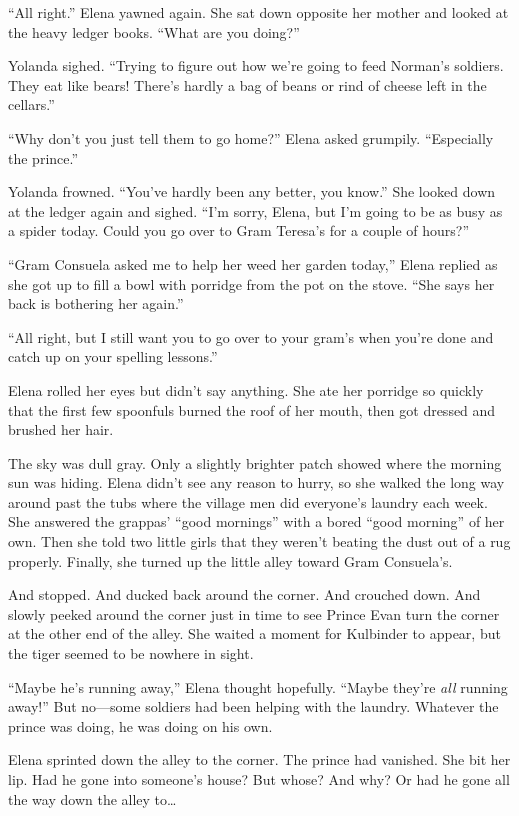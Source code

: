 \documentclass[10pt]{book}
\begin{document}
``All right.'' Elena yawned again. She sat down opposite her mother and looked at the heavy ledger books. ``What are you doing?''

Yolanda sighed. ``Trying to figure out how we're going to feed Norman's soldiers. They eat like bears! There's hardly a bag of beans or rind of cheese left in the cellars.''

``Why don't you just tell them to go home?'' Elena asked grumpily. ``Especially the prince.''

Yolanda frowned. ``You've hardly been any better, you know.'' She looked down at the ledger again and sighed. ``I'm sorry, Elena, but I'm going to be as busy as a spider today. Could you go over to Gram Teresa's for a couple of hours?''

``Gram Consuela asked me to help her weed her garden today,'' Elena replied as she got up to fill a bowl with porridge from the pot on the stove. ``She says her back is bothering her again.''

``All right, but I still want you to go over to your gram's when you're done and catch up on your spelling lessons.''

Elena rolled her eyes but didn't say anything. She ate her porridge so quickly that the first few spoonfuls burned the roof of her mouth, then got dressed and brushed her hair.

The sky was dull gray. Only a slightly brighter patch showed where the morning sun was hiding. Elena didn't see any reason to hurry, so she walked the long way around past the tubs where the village men did everyone's laundry each week. She answered the grappas' ``good mornings'' with a bored ``good morning'' of her own. Then she told two little girls that they weren't beating the dust out of a rug properly. Finally, she turned up the little alley toward Gram Consuela's.

And stopped. And ducked back around the corner. And crouched down. And slowly peeked around the corner just in time to see Prince Evan turn the corner at the other end of the alley.  She waited a moment for Kulbinder to appear, but the tiger seemed to be nowhere in sight.

``Maybe he's running away,'' Elena thought hopefully. ``Maybe they're \emph{all} running away!'' But no---some soldiers had been helping with the laundry. Whatever the prince was doing, he was doing on his own.

Elena sprinted down the alley to the corner. The prince had vanished. She bit her lip. Had he gone into someone's house? But whose? And why?  Or had he gone all the way down the alley to{\ldots}
\end{document}
